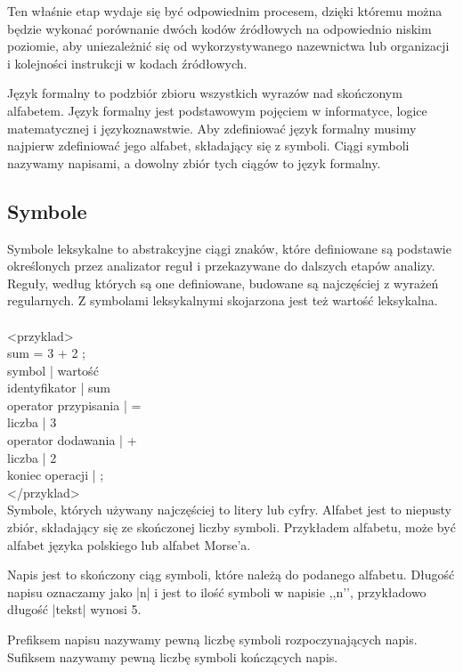 \documentclass[a4paper,12pt]{article}
\begin{document}
Ten właśnie etap wydaje się być odpowiednim procesem, dzięki któremu można będzie wykonać porównanie dwóch kodów źródłowych na odpowiednio niskim poziomie, aby uniezależnić się od wykorzystywanego nazewnictwa lub organizacji i kolejności instrukcji w kodach źródłowych.


Język formalny to podzbiór zbioru wszystkich wyrazów nad skończonym alfabetem. Język formalny jest podstawowym pojęciem w informatyce, logice matematycznej i językoznawstwie. Aby zdefiniować język formalny musimy najpierw zdefiniować jego alfabet, składający się z symboli. Ciągi symboli nazywamy napisami, a dowolny zbiór tych ciągów to język formalny.

\subsection{Symbole}

Symbole leksykalne to abstrakcyjne  ciągi znaków, które definiowane są podstawie określonych przez analizator reguł i przekazywane do dalszych etapów analizy. Reguły, według których są one definiowane, budowane są najczęściej z wyrażeń regularnych.  Z symbolami leksykalnymi skojarzona jest też wartość leksykalna.
\\ \\
<przyklad> \\
sum = 3 + 2 ; \\
symbol 			| 	wartość \\
identyfikator		| 	sum \\
operator przypisania	|	= \\
liczba			|	3 \\
operator dodawania	|	+ \\
liczba			|	2 \\
koniec operacji		|	; \\
</przyklad> \\

Symbole, których używany najczęściej to litery lub cyfry. Alfabet jest to niepusty zbiór, składający się ze skończonej liczby symboli. Przykładem alfabetu, może być alfabet języka polskiego lub alfabet Morse’a.

Napis jest to skończony ciąg symboli, które należą do podanego alfabetu. Długość napisu oznaczamy jako |n| i jest to ilość symboli w napisie ,,n’’, przykładowo długość |tekst| wynosi 5.

Prefiksem napisu nazywamy pewną liczbę symboli rozpoczynających napis. Sufiksem nazywamy pewną liczbę symboli kończących napis. 
\end{document}
